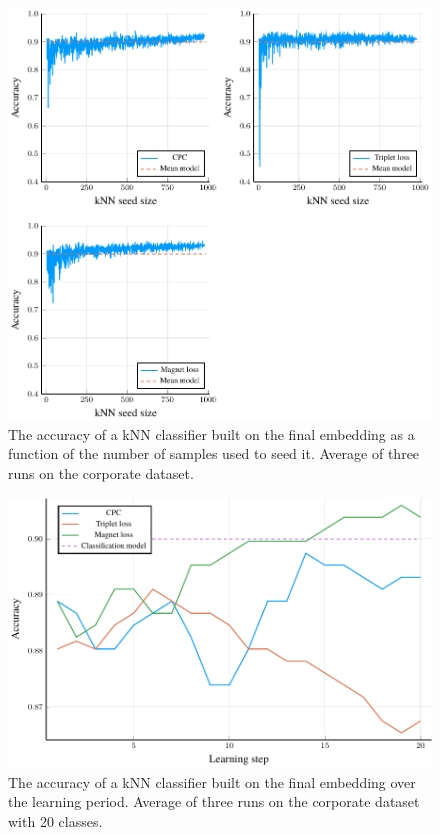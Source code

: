 \begin{figure}
  \centering
  \includegraphics[width=\textwidth]{images/cisco/kNN/cisco-kNN.pdf}
  \caption{The accuracy of a kNN classifier built on the final embedding as a function of the number of samples used to seed it. Average of three runs on the corporate dataset.}\label{fig:cisco-kNN}
\end{figure}

\begin{figure}
  \centering
  \includegraphics[width=\textwidth]{images/cisco-multiclass/accuracy/cisco-multiclass-accuracy.pdf}
  \caption{The accuracy of a kNN classifier built on the final embedding over the learning period. Average of three runs on the corporate dataset with 20 classes.}\label{fig:cisco-kNN}
\end{figure}

